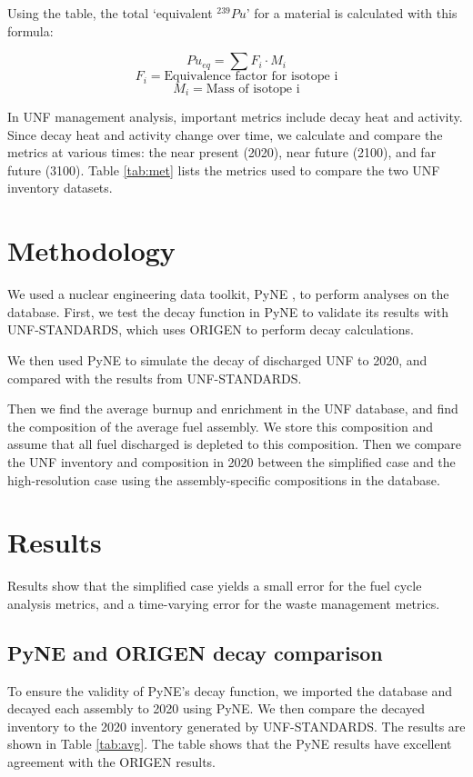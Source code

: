 \documentclass{anstrans}
\begin{document}
Using the table, the total `equivalent $^{239}Pu$' for a material is
calculated with this formula:

\[ Pu_{eq} = \sum{F_i \cdot M_i} \]
\[ F_i = \text{Equivalence factor for isotope i}\]
\[ M_i = \text{Mass of isotope i} \]

In \gls{UNF} management analysis, important metrics include
decay heat and activity. Since decay heat and activity
change over time, we calculate and compare the metrics
at various times: the near present (2020), near future (2100), and far future (3100).
Table \ref{tab:met} lists the metrics used to compare the 
two \gls{UNF} inventory datasets.

\section{Methodology}
We used a nuclear engineering data toolkit, \gls{PyNE} \cite{scopatz_pyne_2012},
to perform analyses on the database. First, 
we test the decay function in \gls{PyNE} to validate its
results with \gls{UNF-STANDARDS}, which uses ORIGEN \cite{bell_origen:_1973} to perform decay calculations.

We then used PyNE to simulate the decay of
discharged \gls{UNF} to 2020, and compared with the
results from \gls{UNF-STANDARDS}.

Then we find the average
burnup and enrichment in the \gls{UNF} database, and
find the composition of the average fuel assembly.
We store this composition and assume that all fuel
discharged is depleted to this composition. Then we
compare the \gls{UNF} inventory and composition in 2020
between the simplified case and the high-resolution case
using the assembly-specific compositions in the database.

\section{Results}
Results show that the simplified case yields a small
error for the fuel cycle analysis metrics, and a time-varying
error for the waste management metrics.


\subsection{PyNE and ORIGEN decay comparison}
To ensure the validity of PyNE's decay function, 
we imported the database and decayed each assembly
to 2020 using PyNE. We then compare the decayed inventory
to the 2020 inventory generated by \gls{UNF-STANDARDS}.
The results are shown in Table \ref{tab:avg}. 
The table shows that the PyNE results have excellent
agreement with the ORIGEN results.
\end{document}
